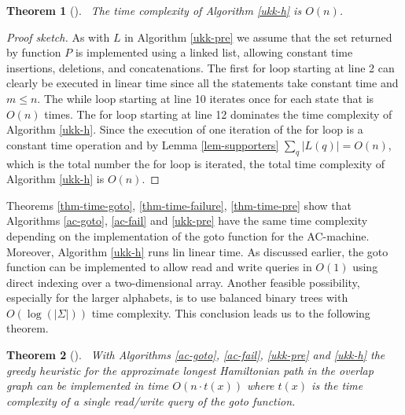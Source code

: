 \documentclass[english,twoside,censored,csm,algorithms-track-2020]{HYthesisML}
\theoremstyle{plain}
\newtheorem{theorem}{Theorem}[chapter]
\theoremstyle{definition}
\numberwithin{testexample}{chapter}
\begin{document}
\begin{theorem}[]~\label{thm-time-h}
  The time complexity of Algorithm \ref{ukk-h} is $O(n)$.
\end{theorem}
\begin{proof}[Proof sketch]

As with $L$ in Algorithm \ref{ukk-pre}
we assume that the set returned by function $P$ is implemented using a linked list, allowing constant
time insertions, deletions, and concatenations. The first for loop starting at line 2 can clearly be
executed in linear time since all the statements take constant time and $m \leq n $. The while loop
starting at line 10 iterates once for each state that is $O(n)$ times. The for loop starting
at line 12 dominates the time complexity of Algorithm \ref{ukk-h}. Since the execution of one iteration
of the for loop is a constant time operation and by Lemma \ref{lem-supporters} $\sum_q |L(q)| = O(n)$,
which is the total number the for loop is iterated, the total time complexity of Algorithm \ref{ukk-h}
is $O(n)$.

\end{proof}

Theorems \ref{thm-time-goto}, \ref{thm-time-failure}, \ref{thm-time-pre}
show that Algorithms \ref{ac-goto}, \ref{ac-fail} and \ref{ukk-pre} have the same time complexity depending
on the implementation of the goto function for the AC-machine. Moreover, Algorithm \ref{ukk-h} runs lin
linear time. As discussed earlier, the goto function
can be implemented to allow read and write queries in  $O(1)$ using direct indexing over a
two-dimensional array. Another feasible possibility, especially for the larger alphabets,
is to use balanced
binary trees with $O(\log(|\Sigma|))$ time complexity. This conclusion leads us to the following theorem.

\begin{theorem}[]~\label{thm-overall-time}
  With Algorithms \ref{ac-goto}, \ref{ac-fail}, \ref{ukk-pre} and \ref{ukk-h} the greedy heuristic
  for the approximate longest Hamiltonian path in the overlap graph can be implemented in time
  $O(n \cdot t(x))$ where $t(x)$ is the time complexity of a single read/write query of the
  goto function.
\end{theorem}



\end{document}
